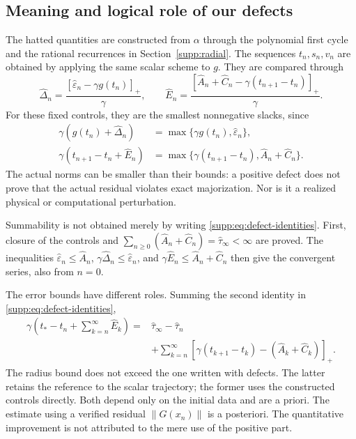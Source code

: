 \documentclass[11pt,a4paper]{article}
\numberwithin{equation}{section}
\numberwithin{table}{section}
\theoremstyle{plain}
\theoremstyle{definition}\newtheorem{definition}[theorem]{Definition}
\theoremstyle{remark}\newtheorem{remark}[theorem]{Remark}
\begin{document}
\subsection{Meaning and logical role of our defects}
The hatted quantities are constructed from $\alpha$ through the
polynomial first cycle and the rational recurrences in
Section~\ref{supp:radial}. The sequences $t_n,s_n,v_n$ are obtained
by applying the same scalar scheme to $g$. They are compared through
\[
 \widehat\Delta_n=\frac{[\widehat\varepsilon_n-\gamma g(t_n)]_+}{\gamma},
 \qquad
 \widehat E_n=\frac{[\widehat A_n+\widehat C_n-
 \gamma(t_{n+1}-t_n)]_+}{\gamma}.
\]
For these fixed controls, they are the smallest nonnegative slacks,
since
\begin{equation}
 \begin{aligned}
 \gamma(g(t_n)+\widehat\Delta_n)
 &=\max\{\gamma g(t_n),\widehat\varepsilon_n\},\\
 \gamma(t_{n+1}-t_n+\widehat E_n)
 &=\max\{\gamma(t_{n+1}-t_n),\widehat A_n+\widehat C_n\}.
 \end{aligned}\label{supp:eq:defect-identities}
\end{equation}
The actual norms can be smaller than their bounds: a positive defect
does not prove that the actual residual violates exact majorization.
Nor is it a realized physical or computational perturbation.

Summability is not obtained merely by writing
\eqref{supp:eq:defect-identities}. First, closure of the controls and
$\sum_{n\geq0}(\widehat A_n+\widehat C_n)=\widehat\tau_\infty<\infty$
are proved. The inequalities
$\widehat\varepsilon_n\leq\widehat A_n$,
$\gamma\widehat\Delta_n\leq\widehat\varepsilon_n$, and
$\gamma\widehat E_n\leq\widehat A_n+\widehat C_n$
then give the convergent series, also from $n=0$.

The error bounds have different roles. Summing the second identity
in \eqref{supp:eq:defect-identities},
\begin{equation}
 \begin{aligned}
 \gamma\left(t_*-t_n+\sum_{k=n}^{\infty}\widehat E_k\right)
 ={}&\widehat\tau_\infty-\widehat\tau_n\\
 &+\sum_{k=n}^{\infty}
 [\gamma(t_{k+1}-t_k)-(\widehat A_k+\widehat C_k)]_+.
 \end{aligned}\label{supp:eq:two-bounds}
\end{equation}
The radius bound does not exceed the one written with defects.
The latter retains the reference to the scalar trajectory; the
former uses the constructed controls directly. Both depend only
on the initial data and are a priori. The estimate using a verified
residual $\|G(x_n)\|$ is a posteriori. The quantitative improvement
is not attributed to the mere use of the positive part.
\end{document}
